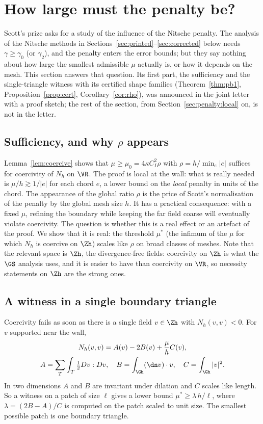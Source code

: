 \section{How large must the penalty be?}\label{sec:penalty}

Scott's prize asks for a study of the influence of the Nitsche penalty. The analysis of the Nitsche methods in Sections~\ref{sec:printed}--\ref{sec:corrected} below needs $\gamma\ge\gamma_0$ (or $\gamma_2$), and the penalty enters the error bounds; but they say nothing about how large the smallest admissible $\mu$ actually is, or how it depends on the mesh. This section answers that question. Its first part, the sufficiency and the single-triangle witness with its certified shape families (Theorem~\ref{thm:pb1}, Proposition~\ref{prop:cert}, Corollary~\ref{cor:rho}), was announced in the joint letter \cite{CavalcantePadhiLetter} with a proof sketch; the rest of the section, from Section~\ref{sec:penalty:local} on, is not in the letter.

\subsection{Sufficiency, and why $\rho$ appears}
Lemma~\ref{lem:coercive} shows that $\mu\ge\mu_0=4\kappa C_I^2\rho$ with $\rho=h/\min_e|e|$ suffices for coercivity of $N_h$ on $\VR$. The proof is local at the wall: what is really needed is $\mu/h\gtrsim1/|e|$ for each chord $e$, a lower bound on the \emph{local} penalty in units of the chord. The appearance of the global ratio $\rho$ is the price of Scott's normalisation of the penalty by the global mesh size $h$. It has a practical consequence: with a fixed $\mu$, refining the boundary while keeping the far field coarse will eventually violate coercivity. The question is whether this is a real effect or an artefact of the proof. We show that it is real: the threshold $\mu^\ast$ (the infimum of the $\mu$ for which $N_h$ is coercive on $\Zh$) scales like $\rho$ on broad classes of meshes. Note that the relevant space is $\Zh$, the divergence-free fields: coercivity on $\Zh$ is what the $\GS$ analysis uses, and it is easier to have than coercivity on $\VR$, so necessity statements on $\Zh$ are the strong ones.

\subsection{A witness in a single boundary triangle}
Coercivity fails as soon as there is a single field $v\in\Zh$ with $N_h(v,v)<0$. For $v$ supported near the wall,
\begin{gather*}
N_h(v,v)=A(v)-2B(v)+\frac\mu h C(v),\\
A=\sum_T\int_T\tfrac12Dv:Dv,\quad B=\int_{\Gh}(\dn v)\cdot v,\quad C=\int_{\Gh}|v|^2 .
\end{gather*}
In two dimensions $A$ and $B$ are invariant under dilation and $C$ scales like length. So a witness on a patch of size $\ell$ gives a lower bound $\mu^\ast\ge\lambda\,h/\ell$, where $\lambda=(2B-A)/C$ is computed on the patch scaled to unit size. The smallest possible patch is one boundary triangle.

